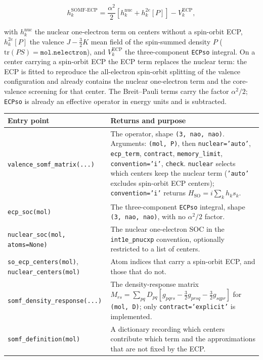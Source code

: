 \begin{equation}
  h^{\mathrm{SOMF\text{-}ECP}}_k
  = \frac{\alpha^{2}}{2}\left[h^{\mathrm{nuc}}_k + h^{2e}_k[P]\right]
    - V^{\mathrm{ECP}}_k,
  \label{eq:new-somf-ecp}
\end{equation}

with $h^{\mathrm{nuc}}_k$ the nuclear one-electron term on centers
without a spin-orbit ECP, $h^{2e}_k[P]$ the valence
$J - \tfrac{3}{2}K$ mean field of the spin-summed density $P$
($\mathrm{tr}(PS) = \texttt{mol.nelectron}$), and $V^{\mathrm{ECP}}_k$
the three-component \texttt{ECPso} integral.  On a center carrying a
spin-orbit ECP the ECP term replaces the nuclear term: the ECP is
fitted to reproduce the all-electron spin-orbit splitting of the
valence configuration and already contains the nuclear one-electron
term and the core-valence screening for that center.  The
Breit--Pauli terms carry the factor $\alpha^2/2$; \texttt{ECPso} is
already an effective operator in energy units and is subtracted.

\begin{center}
\small
\begin{tabularx}{\textwidth}{>{\raggedright\arraybackslash}p{}>{\raggedright\arraybackslash}X}
\toprule
Entry point & Returns and purpose \\
\midrule
\texttt{valence\_somf\_matrix(...)} &
  The operator, shape \texttt{(3, nao, nao)}.  Arguments:
  \texttt{(mol, P)}, then \texttt{nuclear='auto'}, \texttt{ecp\_term},
  \texttt{contract}, \texttt{memory\_limit}, \texttt{convention='i'},
  \texttt{check}.  \texttt{nuclear} selects which centers keep the
  nuclear term (\texttt{'auto'} excludes spin-orbit ECP centers);
  \texttt{convention='i'} returns
  $H_{\mathrm{SO}} = i\sum_k h_k s_k$. \\
\texttt{ecp\_soc(mol)} &
  The three-component \texttt{ECPso} integral, shape
  \texttt{(3, nao, nao)}, with no $\alpha^2/2$ factor. \\
\texttt{nuclear\_soc(mol, atoms=None)} &
  The nuclear one-electron SOC in the \texttt{int1e\_pnucxp}
  convention, optionally restricted to a list of centers. \\
\texttt{so\_ecp\_centers(mol)}, \texttt{nuclear\_centers(mol)} &
  Atom indices that carry a spin-orbit ECP, and those that do not. \\
\texttt{somf\_density\_response(...)} &
  The density-response matrix $M_{rs} = \sum_{pq} D_{pq}
  [g_{pqrs} - \tfrac{3}{2} g_{prsq} - \tfrac{3}{2} g_{sqpr}]$ for
  \texttt{(mol, D)}; only \texttt{contract='explicit'} is implemented. \\
\texttt{somf\_definition(mol)} &
  A dictionary recording which centers contribute which term and the
  approximations that are not fixed by the ECP. \\
\bottomrule
\end{tabularx}
\end{center}

